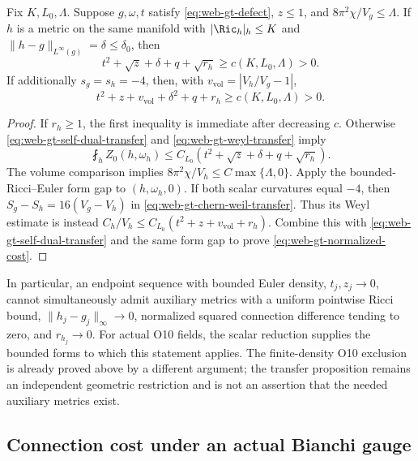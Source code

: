\begin{proposition}
\label{prop:web-gt-cost}
Fix \(K,L_0,\Lambda\).  Suppose \(g,\omega,t\) satisfy
\eqref{eq:web-gt-defect}, \(z\le1\), and
\(8\pi^2\chi/V_g\le\Lambda\).  If \(h\) is a metric on the same
manifold with \(|\Ric_h|_h\le K\) and
\(\|h-g\|_{L^\infty(g)}=\delta\le\delta_0\), then
\begin{equation}
 t^2+\sqrt z+\delta+q+\sqrt{r_h}\ge c(K,L_0,\Lambda)>0.
 \label{eq:web-gt-regularization-cost}
\end{equation}
If additionally \(s_g=s_h=-4\), then, with
\(v_{\mathrm{vol}}=|V_h/V_g-1|\),
\begin{equation}
 t^2+z+v_{\mathrm{vol}}+\delta^2+q+r_h
       \ge c(K,L_0,\Lambda)>0.
 \label{eq:web-gt-normalized-cost}
\end{equation}
\end{proposition}

\begin{proof}
If \(r_h\ge1\), the first inequality is immediate after decreasing
\(c\).  Otherwise \eqref{eq:web-gt-self-dual-transfer} and
\eqref{eq:web-gt-weyl-transfer} imply
\[
 \fint_h Z_0(h,\omega_h)
       \le C_{L_0}(t^2+\sqrt z+\delta+q+\sqrt{r_h}).
\]
The volume comparison implies
\(8\pi^2\chi/V_h\le C\max\{\Lambda,0\}\).  Apply the
bounded-Ricci--Euler form gap to \((h,\omega_h,0)\).
If both scalar curvatures equal \(-4\), then
\(S_g-S_h=16(V_g-V_h)\) in
\eqref{eq:web-gt-chern-weil-transfer}.  Thus its Weyl estimate is instead
\(C_h/V_h\le C_{L_0}(t^2+z+v_{\mathrm{vol}}+r_h)\).
Combine this with \eqref{eq:web-gt-self-dual-transfer} and the same form
gap to prove \eqref{eq:web-gt-normalized-cost}.
\end{proof}

In particular, an endpoint sequence with bounded Euler density,
\(t_j,z_j\to0\), cannot simultaneously admit auxiliary metrics with a
uniform pointwise Ricci bound, \(\|h_j-g_j\|_\infty\to0\), normalized
squared connection difference tending to zero, and \(r_{h_j}\to0\).
For actual O10 fields, the scalar reduction supplies the bounded forms to
which this statement applies.  The finite-density O10 exclusion is already
proved above by a different argument; the transfer proposition remains an
independent geometric restriction and is not an assertion that the needed
auxiliary metrics exist.

\subsection{Connection cost under an actual Bianchi gauge}

